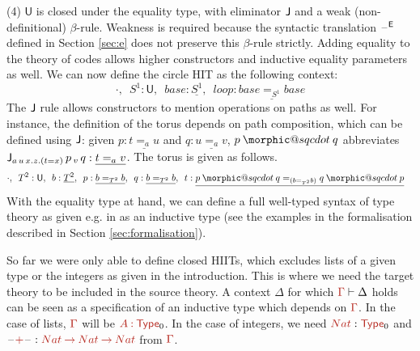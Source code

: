 \documentclass[a4paper,UKenglish]{lipics-v2018}
\makeatletter
\DeclareRobustCommand{\sqcdot}{\mathbin{\mathpalette\morphic@sqcdot\relax}}
\newcommand{\morphic@sqcdot}[2]{%
  \sbox\z@{$\m@th#1\centerdot$}%
  \ht\z@=.33333\ht\z@
  \vcenter{\box\z@}%
}
\newcommand{\U}{\mathsf{U}}
\newcommand{\ra}{\rightarrow}
\newcommand{\blank}{\mathord{\hspace{1pt}\text{--}\hspace{1pt}}} %
\newcommand{\1}{\mathsf{1}} \renewcommand{\Pr}{\mathsf{Pr}}
\renewcommand{\in}{\mathbin{\hat:}}
\renewcommand{\hat}[1]{{\color{BrickRed}{#1}}}
\newcommand{\rah}{\mathbin{\hat\ra}}
\newcommand{\Type}{\hat{\mathsf{Type}}}
\makeatother
\begin{document}
(4) $\U$ is closed under the equality type, with eliminator $\mathsf{J}$ and a
weak (non-definitional) $\beta$-rule. Weakness is required because the
syntactic translation $\blank^\E$ defined in Section \ref{sec:e} does
not preserve this $\beta$-rule strictly. Adding equality to the theory
of codes allows higher constructors and inductive equality parameters
as well. We can now define the circle HIT as the following context:
\[
\cdot,\,\,\,S^1:\U,\,\,\,base:\underline{S^1},\,\,\,loop:\underline{base =_{S^1} base}
\]
The $\mathsf{J}$ rule allows constructors to mention operations on paths as
well. For instance, the definition of the torus depends on path
composition, which can be defined using $\mathsf{J}$: given $p:\underline{t=_a
  u}$ and $q:\underline{u=_a v}$, $p \sqcdot q$ abbreviates
$\mathsf{J}_{a\,u\,x.z.(t=x)}\,p\,_v\,q : \underline{t=_a v}$. The torus is
given as follows.
\begin{alignat*}{5}
  & \cdot,\,\,\,T^2:\U,\,\,\,b : \underline{T^2},\,\,\, p:\underline{b =_{T^2} b},\,\,\,q:\underline{b=_{T^2} b},\,\,\, t:\underline{p\sqcdot q=_{(b=_{T^2} b)} q\sqcdot p}
\end{alignat*}
With the equality type at hand, we can define a full well-typed syntax
of type theory as given e.g. in \cite{ttintt} as an inductive type
(see the examples in the formalisation described in Section
\ref{sec:formalisation}).

So far we were only able to define closed HIITs, which excludes lists
of a given type or the integers as given in the introduction. This is
where we need the target theory to be included in the source theory. A
context $\Delta$ for which $\hat{\Gamma}\vdash\Delta$ holds can be
seen as a specification of an inductive type which depends on
$\hat{\Gamma}$. In the case of lists, $\hat{\Gamma}$ will be
$\hat{A}\in\Type_0$. In the case of integers, we need
$\hat{Nat}:\Type_0$ and $\blank\hat{\mathbin{+}}\blank:\hat{Nat}\rah
\hat{Nat}\rah \hat{Nat}$ from $\hat{\Gamma}$.
\end{document}
